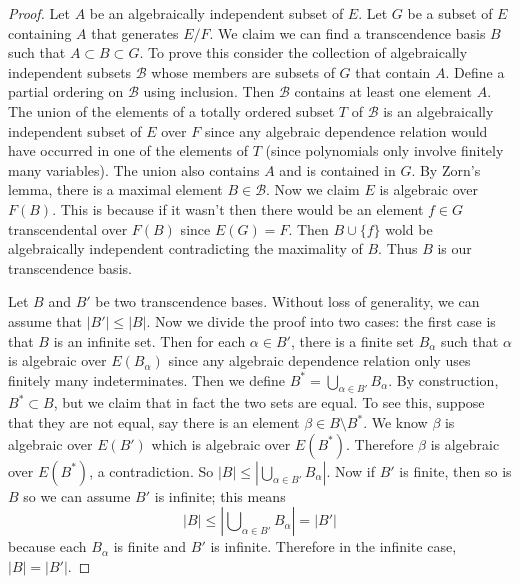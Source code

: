 \begin{proof}
Let $A$ be an algebraically independent subset of $E$. Let $G$ be a subset
of $E$ containing $A$ that generates $E/F$. We claim we can find a
transcendence basis $B$ such that $A \subset B \subset G$.
To prove this consider the collection of algebraically independent subsets
$\mathcal{B}$ whose members are subsets of $G$ that contain $A$.
Define a partial ordering on $\mathcal{B}$ using inclusion.
Then $\mathcal{B}$ contains at least one element $A$.
The union of the elements of a totally ordered subset $T$ of $\mathcal{B}$
is an algebraically independent subset of $E$ over $F$ since any algebraic
dependence relation would have occurred in one of the elements of $T$
(since polynomials only involve finitely many variables). The union also
contains $A$ and is contained in $G$. By Zorn's lemma, there is a maximal
element $B \in \mathcal{B}$. Now we claim $E$ is algebraic over $F(B)$.
This is because if it wasn't then there would be an element
$f \in G$ transcendental over $F(B)$ since $E(G) = F$. Then
$B \cup\{f\}$ wold be algebraically independent contradicting the
maximality of $B$. Thus $B$ is our transcendence basis.

\medskip\noindent
Let $B$ and $B'$ be two transcendence bases. Without loss of generality, we
can assume that $|B'| \leq |B|$. Now we divide the proof into two cases: the
first case is that $B$ is an infinite set. Then for each $\alpha \in B'$,
there is a finite set $B_{\alpha}$ such that $\alpha$ is algebraic over
$E(B_{\alpha})$ since any algebraic dependence relation only uses finitely many
indeterminates. Then we define $B^* = \bigcup_{\alpha\in B'} B_{\alpha}$.
By construction, $B^* \subset B$, but we claim that in fact the two sets are
equal. To see this, suppose that they are not equal, say there is an element
$\beta \in B \setminus B^*$. We know $\beta$ is algebraic over $E(B')$ which
is algebraic over $E(B^*)$. Therefore $\beta$ is algebraic over $E(B^*)$, a
contradiction. So $|B| \leq |\bigcup_{\alpha \in B'} B_{\alpha}|$.
Now if $B'$ is finite, then so is $B$ so we can assume $B'$ is infinite;
this means
$$
|B| \leq |\bigcup\nolimits_{\alpha \in B'} B_{\alpha}| = |B'|
$$
because each $B_\alpha$ is finite and $B'$ is infinite. Therefore in the
infinite case, $|B| = |B'|$.


\end{proof}
